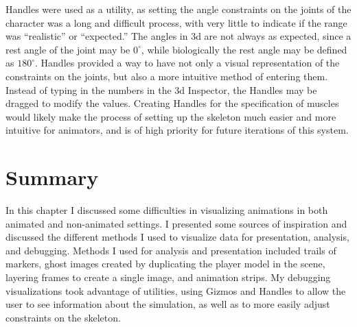 Handles were used as a utility, as setting the angle constraints on the joints of the character was a long and difficult process, with very little to indicate if the range was ``realistic'' or ``expected.'' The angles in \unity3d{} are not always as expected, since a rest angle of the joint may be $0^\circ$, while biologically the rest angle may be defined as $180^\circ$.  Handles provided a way to have not only a visual representation of the constraints on the joints, but also a more intuitive method of entering them.  Instead of typing in the numbers in the \unity3d{} Inspector, the Handles may be dragged to modify the values.  Creating Handles for the specification of muscles would likely make the process of setting up the skeleton much easier and more intuitive for animators, and is of high priority for future iterations of this system.

\section{Summary}
In this chapter I discussed some difficulties in visualizing animations in both animated and non-animated settings.  I presented some sources of inspiration and discussed the different methods I used to visualize data for presentation, analysis, and debugging.  Methods I used for analysis and presentation included trails of markers, ghost images created by duplicating the player model in the scene, layering frames to create a single image, and animation strips.  My debugging visualizations took advantage of \unity{} utilities, using Gizmos and Handles to allow the user to see information about the simulation, as well as to more easily adjust constraints on the skeleton.
\label{section:vis_summary}
